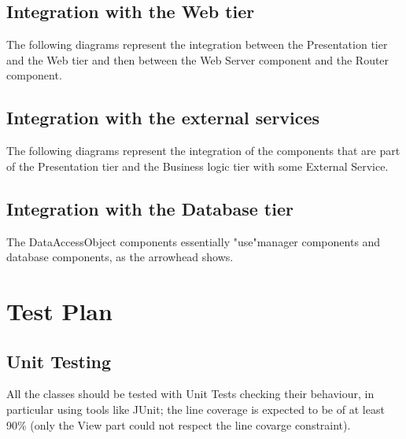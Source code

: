 \documentclass[../DD.tex]{subfiles}
\begin{document}

\subsection{Integration with the Web tier}
The following diagrams represent the integration between the Presentation tier and the Web tier and then between the Web Server component and the Router component.


\subsection{Integration with the external services}
The following diagrams represent the integration of the components that are part of the Presentation tier and the Business logic tier with some External Service.


\subsection{Integration with the Database tier}
The DataAccessObject components essentially "use"manager components and database components, as the arrowhead shows.


\section{Test Plan\label{5.4}}

\subsection{Unit Testing\label{5.4.1}}
All the classes should be tested with Unit Tests checking their behaviour, in particular using tools like JUnit; the line coverage is expected to be of at least 90\% (only the View part could not respect the line covarge constraint).
\end{document}
